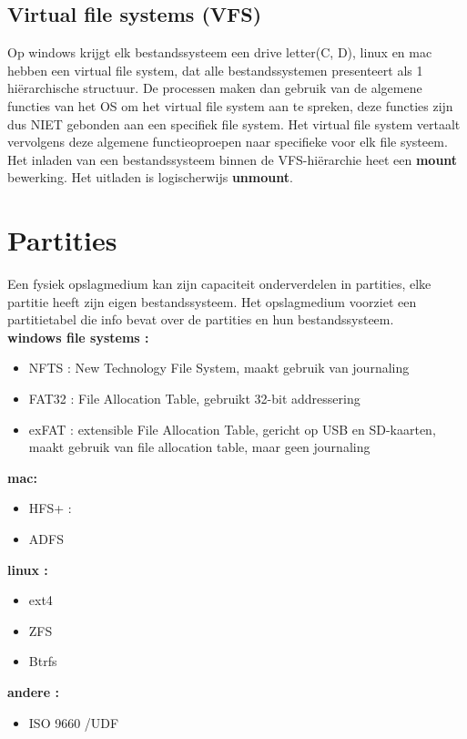 \documentclass{report}
\begin{document}
   			\subsection{Virtual file systems (VFS)}
   				Op windows krijgt elk bestandssysteem een drive letter(C, D), linux en mac hebben een virtual file system, dat alle bestandssystemen presenteert als 1 hiërarchische structuur. De processen maken dan gebruik van de algemene functies van het OS om het virtual file system aan te spreken, deze functies zijn dus NIET gebonden aan een specifiek file system. Het virtual file system vertaalt vervolgens deze algemene functieoproepen naar specifieke voor elk file systeem. Het inladen van een bestandssysteem binnen de VFS-hiërarchie heet een \textbf{mount} bewerking. Het uitladen is logischerwijs \textbf{unmount}.
   		\section{Partities}
   			Een fysiek opslagmedium kan zijn capaciteit onderverdelen in partities, elke partitie heeft zijn eigen bestandssysteem. Het opslagmedium voorziet een partitietabel die info bevat over de partities en hun bestandssysteem.
   			\\
   			\textbf{windows file systems : }
   			\begin{itemize}
   				\item NFTS : New Technology File System, maakt gebruik van journaling
   				\item FAT32 : File Allocation Table, gebruikt 32-bit addressering
   				\item exFAT : extensible File Allocation Table, gericht op USB en SD-kaarten, maakt gebruik van file allocation table, maar geen journaling
   			\end{itemize}
   			\textbf{mac: }
   			\begin{itemize}
   				\item HFS+ : 
   				\item ADFS
   			\end{itemize}
   			\textbf{linux : }
   			\begin{itemize}
   				\item ext4
   				\item ZFS
   				\item Btrfs
   			\end{itemize}
   			\textbf{andere :}
   			\begin{itemize}
   				\item ISO 9660 /UDF
   			\end{itemize}
   	
   			
\end{document}
